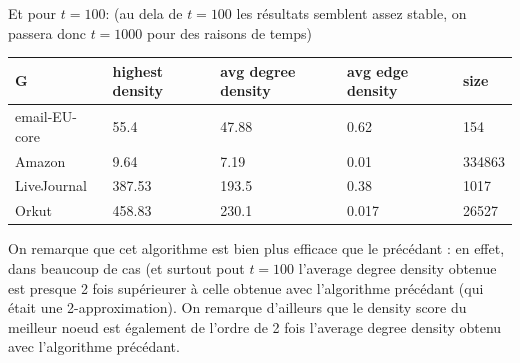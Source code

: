 \documentclass[a4paper]{report}
\begin{document}
Et pour $t = 100$: (au dela de $t = 100$ les résultats semblent assez stable, on passera donc $t = 1000$ pour des raisons de temps)
\begin{center}
  \begin{tabular}{|l|l|l|l|l|}
    \hline
    G & highest density & avg degree density & avg edge density & size\\
    \hline
    email-EU-core & 55.4 & 47.88 & 0.62 & 154 \\
    Amazon & 9.64 & 7.19 & 0.01 & 334863 \\
    LiveJournal & 387.53 & 193.5 & 0.38 & 1017 \\
    Orkut & 458.83 & 230.1 & 0.017 & 26527 \\
    \hline
  \end{tabular}
\end{center}

On remarque que cet algorithme est bien plus efficace que le précédant : en effet, dans beaucoup de cas (et surtout pout $t = 100$ l'average degree density obtenue est presque 2 fois supérieurer à celle obtenue avec l'algorithme précédant (qui était une 2-approximation). On remarque d'ailleurs que le density score du meilleur noeud est également de l'ordre de 2 fois l'average degree density obtenu avec l'algorithme précédant.
\end{document}

